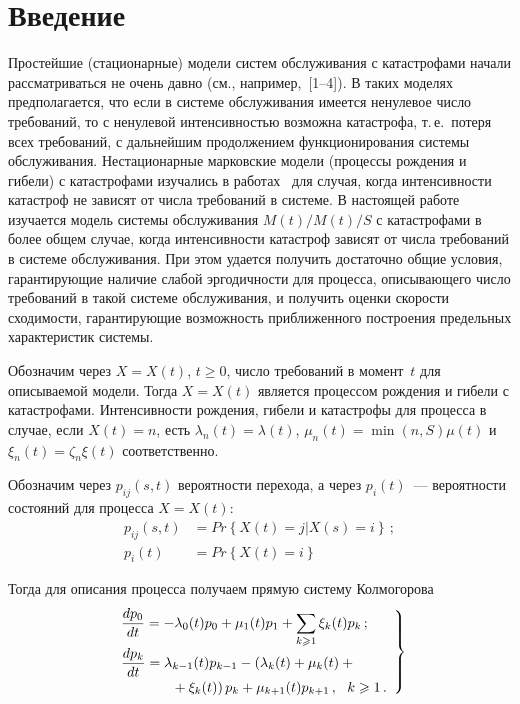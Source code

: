       \begin{multicols}{2}

      \label{st\stat}

\section{Введение}

Простейшие (стационарные) модели систем обслуживания с катастрофами начали
рассматриваться не очень давно (см., например,~[1--4]). В таких моделях предполагается, что если в системе обслуживания имеется ненулевое
число требований, то с ненулевой интенсивностью возможна катастрофа, т.\,е.\ потеря всех требований, с дальнейшим
продолжением функционирования системы обслуживания. Нестационарные марковские модели (процессы рождения и гибели)
с катастрофами изучались в  работах~\cite{z08, z09} для случая, когда интенсивности катастроф не зависят от числа
требований в сис\-те\-ме. В настоящей работе изучается модель сис\-те\-мы обслуживания
 $M(t)/M(t)/S$ с катастрофами в более общем случае, когда интенсивности катастроф
 зависят от числа требований в сис\-те\-ме обслуживания. При этом удается получить достаточно общие условия,
 гарантирующие наличие слабой эргодичности для процесса, описывающего число требований в такой сис\-те\-ме
 обслуживания, и получить оценки скорости сходимости, гарантирующие возможность приближенного построения
 предельных характеристик сис\-темы.

Обозначим через $X=X(t)$, $t\geq 0$, число требований в момент~$t$ для описываемой модели.
Тогда $X=X(t)$ является процессом рождения и гибели с катастрофами.  Интенсивности рождения,
гибели и катастрофы для процесса в случае, если  $X(t)= n$, есть  $\lambda_n(t) = \lambda(t)$,
$\mu_n(t) = \min(n,S)\mu(t)$ и $\xi_n(t)= \zeta_n \xi (t)$ соответственно.

Обозначим через $p_{ij}(s,t)$ вероятности перехода,
а через  $p_i(t)$~--- вероятности состояний для процесса $X=X(t)$:
\begin{align*}
p_{ij}(s,t)&=Pr\left\{ X(t)=j\left| X(s)=i\right. \right\}\,;\\
p_i(t)&=Pr\left\{ X(t) =i \right\}
\end{align*}

Тогда для описания процесса получаем прямую систему Колмогорова
\begin{equation}
\left.
\begin{array}{l}
\displaystyle \displaystyle\frac{\displaystyle dp_0\mathstrut}{\displaystyle dt\mathstrut} = -\lambda_0 (t) p_0 +\mu_1(t)p_1 + \sum\limits_{k \geqslant 1}\xi_k(t)p_k\,;  \\
\displaystyle \displaystyle\frac{\displaystyle dp_k\mathstrut}{\displaystyle dt\mathstrut} = \lambda_{k-1} (t)p_{k-1} -\left(\lambda_{k} (t) +  \mu_{k}(t)+{}\right. \\
\hspace*{35pt}\left.{}+\xi_k(t)\right)p_k +\mu_{k+1}(t) p_{k+1}\,,\ \   k \geqslant 1\,.
\end{array}
\right \}
\label{zkts01}
\end{equation}


\end{multicols}
